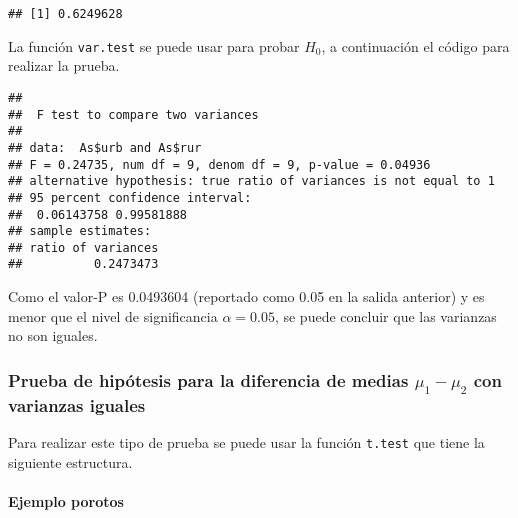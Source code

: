 \documentclass[
]{article}
\newenvironment{Shaded}{}{}
\newcommand{\AttributeTok}[1]{\textcolor[rgb]{0.49,0.56,0.16}{#1}}
\newcommand{\DecValTok}[1]{\textcolor[rgb]{0.25,0.63,0.44}{#1}}
\newcommand{\FloatTok}[1]{\textcolor[rgb]{0.25,0.63,0.44}{#1}}
\newcommand{\FunctionTok}[1]{\textcolor[rgb]{0.02,0.16,0.49}{#1}}
\newcommand{\NormalTok}[1]{#1}
\newcommand{\SpecialCharTok}[1]{\textcolor[rgb]{0.25,0.44,0.63}{#1}}
\newcommand{\StringTok}[1]{\textcolor[rgb]{0.25,0.44,0.63}{#1}}
\begin{document}
\begin{verbatim}
## [1] 0.6249628
\end{verbatim}

La función \texttt{var.test} se puede usar para probar \(H_0\), a
continuación el código para realizar la prueba.

\begin{Shaded}
\end{Shaded}

\begin{verbatim}
## 
##  F test to compare two variances
## 
## data:  As$urb and As$rur
## F = 0.24735, num df = 9, denom df = 9, p-value = 0.04936
## alternative hypothesis: true ratio of variances is not equal to 1
## 95 percent confidence interval:
##  0.06143758 0.99581888
## sample estimates:
## ratio of variances 
##          0.2473473
\end{verbatim}

Como el valor-P es 0.0493604 (reportado como 0.05 en la salida anterior)
y es menor que el nivel de significancia \(\alpha=0.05\), se puede
concluir que las varianzas no son iguales.

\hypertarget{prueba-de-hipuxf3tesis-para-la-diferencia-de-medias-mu_1-mu_2-con-varianzas-iguales}{%
\subsubsection{\texorpdfstring{Prueba de hipótesis para la diferencia de
medias \(\mu_1-\mu_2\) con varianzas
iguales}{Prueba de hipótesis para la diferencia de medias \textbackslash mu\_1-\textbackslash mu\_2 con varianzas iguales}}\label{prueba-de-hipuxf3tesis-para-la-diferencia-de-medias-mu_1-mu_2-con-varianzas-iguales}}

Para realizar este tipo de prueba se puede usar la función
\texttt{t.test} que tiene la siguiente estructura.

\hypertarget{ejemplo-porotos}{%
\paragraph{Ejemplo porotos}\label{ejemplo-porotos}}
\end{document}
